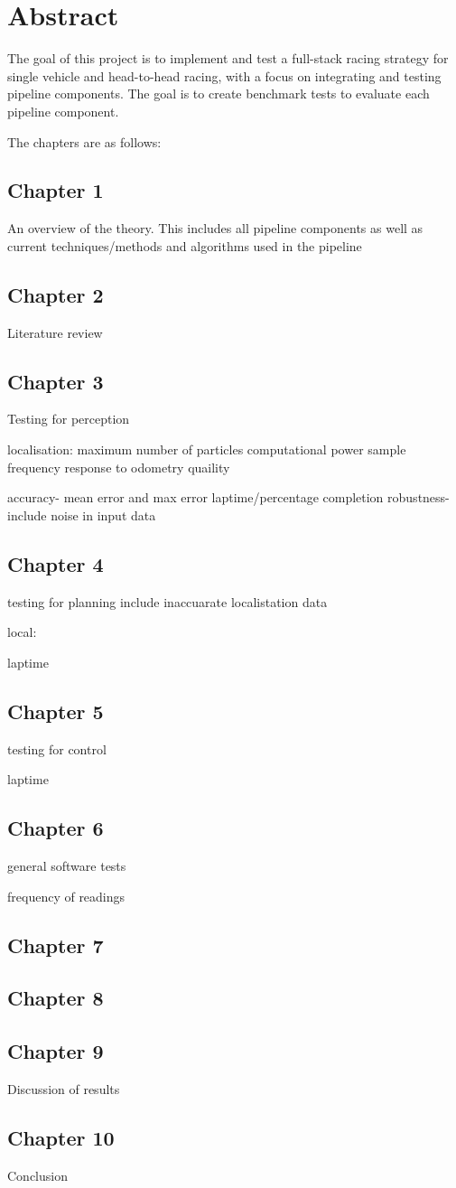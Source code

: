 \chapter{Abstract}

The goal of this project is to implement and test a full-stack racing strategy for single vehicle and head-to-head racing, with a focus on integrating and testing pipeline components. The goal is to create benchmark tests to evaluate each pipeline component.

The chapters are as follows:
\section{Chapter 1}
An overview of the theory. This includes all pipeline components as well as current techniques/methods and algorithms used in the pipeline
\section{Chapter 2}
Literature review
\section{Chapter 3}
Testing for perception

localisation:
maximum number of particles
computational power
sample frequency
response to odometry quaility

accuracy- mean error and max error
laptime/percentage completion
robustness-include noise in input data
\section{Chapter 4}
testing for planning
include inaccuarate localistation data

local:



laptime
\section{Chapter 5}
testing for control

laptime
\section{Chapter 6}
general software tests

frequency of readings
\section{Chapter 7}

\section{Chapter 8}

\section{Chapter 9}
Discussion of results
\section{Chapter 10}
Conclusion


